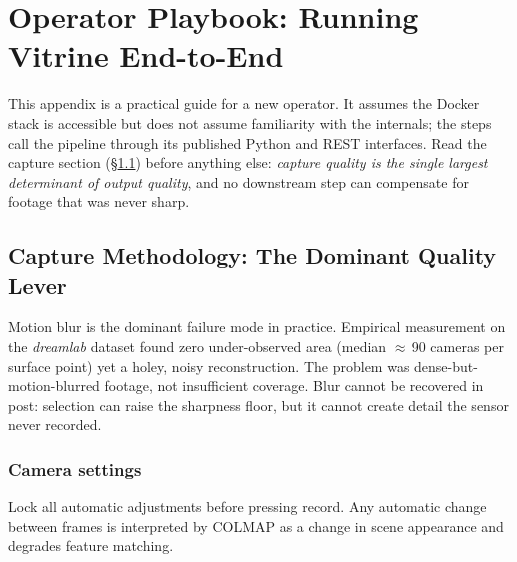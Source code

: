 %   
%

\chapter{Operator Playbook: Running Vitrine End-to-End}
\label{app:playbook}

This appendix is a practical guide for a new operator.  It assumes the Docker
stack is accessible but does not assume familiarity with the internals; the
steps call the pipeline through its published Python and REST interfaces.
Read the capture section (\S\ref{sec:pb-capture}) before anything else:
\emph{capture quality is the single largest determinant of output quality},
and no downstream step can compensate for footage that was never sharp.

\section{Capture Methodology: The Dominant Quality Lever}
\label{sec:pb-capture}

\begin{keyfinding}
Motion blur is the dominant failure mode in practice.  Empirical measurement
on the \emph{dreamlab} dataset found zero under-observed area (median
$\approx$\,90 cameras per surface point) yet a holey, noisy reconstruction.
The problem was dense-but-motion-blurred footage, not insufficient coverage.
Blur cannot be recovered in post: selection can raise the sharpness floor, but
it cannot create detail the sensor never recorded.
\end{keyfinding}

\subsection{Camera settings}
\label{sec:pb-camera-settings}

Lock all automatic adjustments before pressing record.  Any automatic change
between frames is interpreted by COLMAP as a change in scene appearance and
degrades feature matching.

